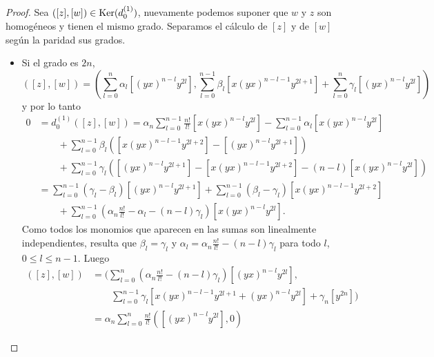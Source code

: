 \documentclass[fleqn,../tesis.tex]{subfiles}
\begin{document}
\begin{proof}
    Sea $\left([z], [w]\right) \in \operatorname{Ker}(d_{0}^{(1)})$, nuevamente podemos suponer que $w$ y $z$ son homogéneos y tienen el mismo grado.
    Separamos el cálculo de $[z]$ y de $[w]$ según la paridad sus grados.
    \begin{itemize}
        \item Si el grado es $2n$,
            \[
                ([z], [w]) = \left( \sum_{l = 0}^{n} \alpha_l\left[(yx)^{n - l}y^{2l}\right],
                    \sum_{l = 0}^{n - 1}\beta_l \left[x (yx)^{n - l - 1}y^{2l + 1}\right]
                        +  \sum_{l = 0}^{n} \gamma_l\left[(yx)^{n - l}y^{2l}\right]\right)               
            \]
        y por lo tanto
        \begin{align*}
            0 &= d_{0}^{(1)}([z], [w]) = \alpha_n \sum_{l = 0}^{n - 1}\frac{n!}{l!}\left[x(yx)^{n - l}y^{2l}\right]
               - \sum_{l = 0}^{n - 1}\alpha_l \left[x(yx)^{n - l}y^{2l}\right]\\
            &\qquad  + \sum_{l = 0}^{n - 1}\beta_l \left(\left[x(yx)^{n - l - 1}y^{2l + 2}\right] - \left[(yx)^{n - l}y^{2l + 1} \right] \right)\\
            &\qquad + \sum_{l = 0}^{n - 1}\gamma_l \left(\left[(yx)^{n - l}y^{2l + 1} \right]
                - \left[x(yx)^{n - l - 1}y^{2l + 2}\right] - (n - l)\left[x(yx)^{n - l}y^{2l} \right]\right)\\
            &= \sum_{l = 0}^{n - 1}(\gamma_l - \beta_l)\left[(yx)^{n - l}y^{2l + 1}\right]
                + \sum_{l = 0}^{n - 1}(\beta_l - \gamma_l)\left[ x(yx)^{n - l - 1}y^{2l + 2} \right] \\
            &\qquad + \sum_{l = 0}^{n - 1}\left( \alpha_n \frac{n!}{l!} - \alpha_l -(n - l)\gamma_l \right)\left[x(yx)^{n - l}y^{2l}\right].
        \end{align*}
        Como todos los monomios que aparecen en las sumas son linealmente independientes, resulta que $\beta_l = \gamma_l$
            y $\alpha_l = \alpha_n \frac{n!}{l!} - (n - l)\gamma_l$ para todo $l$, $0 \leq l \leq n - 1$. Luego
        \begin{align*}
            ([z], [w]) &= \Bigg(\sum_{l = 0}^{n}\left(\alpha_n \frac{n!}{l!} - (n - l)\gamma_l\right)\left[(yx)^{n - l}y^{2l}\right],\\
                &\qquad \sum_{l = 0}^{n - 1}\gamma_l\left[ x(yx)^{n - l-1 }y^{2l + 1} + (yx)^{n - l}y^{2l}\right]
                    + \gamma_n\left[y^{2n}\right]\Bigg)\\
            &= \alpha_n \sum_{l = 0}^n\frac{n!}{l!}\left( \left[(yx)^{n - l}y^{2l} \right], 0 \right)

\end{align*}
\end{itemize}
\end{proof}
\end{document}
